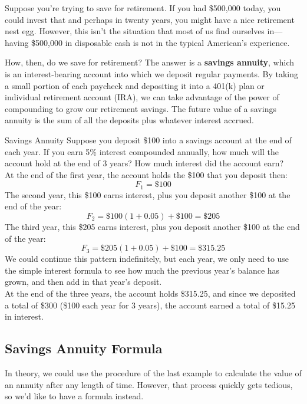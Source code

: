 \setcounter{ExampleCounter}{1}
Suppose you're trying to save for retirement.  If you had \$500,000 today, you could invest that and perhaps in twenty years, you might have a nice retirement nest egg.  However, this isn't the situation that most of us find ourselves in---having \$500,000 in disposable cash is not in the typical American's experience.

How, then, do we save for retirement?  The answer is a \textbf{savings annuity}, which is an interest-bearing account into which we deposit regular payments.  By taking a small portion of each paycheck and depositing it into a 401(k) plan or individual retirement account (IRA), we can take advantage of the power of compounding to grow our retirement savings.  The future value of a savings annuity is the sum of all the deposits plus whatever interest accrued.

\begin{example}[https://www.youtube.com/watch?v=KOIRAWGh9vM]{Savings Annuity}
Suppose you deposit \$100 into a savings account at the end of each year.  If you earn 5\% interest compounded annually, how much will the account hold at the end of 3 years?  How much interest did the account earn?\\

At the end of the first year, the account holds the \$100 that you deposit then:
\[F_1 = \$100\]
The second year, this \$100 earns interest, plus you deposit another \$100 at the end of the year:
\[F_2 = \$100(1+0.05) + \$100 = \$205\]
The third year, this \$205 earns interest, plus you deposit another \$100 at the end of the year:
\[F_3 = \$205(1+0.05) + \$100 = \$315.25\]
We could continue this pattern indefinitely, but each year, we only need to use the simple interest formula to see how much the previous year's balance has grown, and then add in that year's deposit.\\

At the end of the three years, the account holds \$315.25, and since we deposited a total of \$300 (\$100 each year for 3 years), the account earned a total of \$15.25 in interest.
\end{example}

\subsection{Savings Annuity Formula}
In theory, we could use the procedure of the last example to calculate the value of an annuity after any length of time.  However, that process quickly gets tedious, so we'd like to have a formula instead.\\


